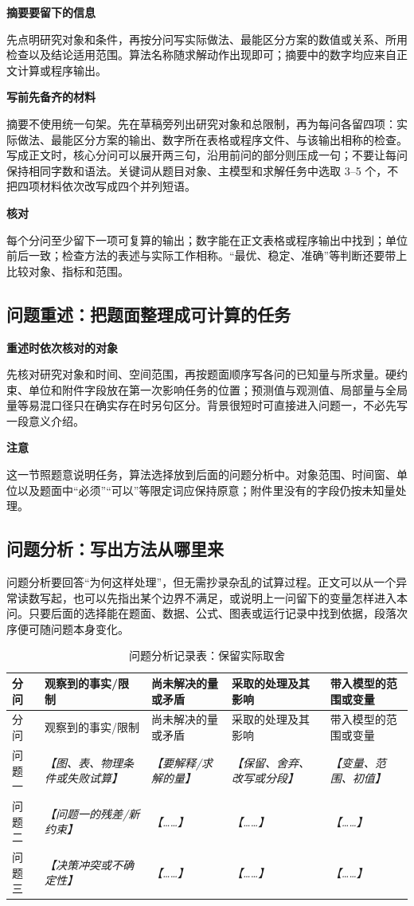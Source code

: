 \documentclass[UTF8,zihao=-4]{ctexart}
\newcommand{\slot}[1]{\textcolor{inkblue}{\textit{【#1】}}}
\newcommand{\guidehead}[1]{\par\medskip\noindent\textbf{\color{inkblue}#1}\par}
\begin{document}
\guidehead{摘要要留下的信息}先点明研究对象和条件，再按分问写实际做法、最能区分方案的数值或关系、所用检查以及结论适用范围。算法名称随求解动作出现即可；摘要中的数字均应来自正文计算或程序输出。

\guidehead{写前先备齐的材料}摘要不使用统一句架。先在草稿旁列出研究对象和总限制，再为每问各留四项：实际做法、最能区分方案的输出、数字所在表格或程序文件、与该输出相称的检查。写成正文时，核心分问可以展开两三句，沿用前问的部分则压成一句；不要让每问保持相同字数和语法。关键词从题目对象、主模型和求解任务中选取 3--5 个，不把四项材料依次改写成四个并列短语。

\guidehead{核对}每个分问至少留下一项可复算的输出；数字能在正文表格或程序输出中找到；单位前后一致；检查方法的表述与实际工作相称。“最优、稳定、准确”等判断还要带上比较对象、指标和范围。

\subsection{问题重述：把题面整理成可计算的任务}

\guidehead{重述时依次核对的对象}先核对研究对象和时间、空间范围，再按题面顺序写各问的已知量与所求量。硬约束、单位和附件字段放在第一次影响任务的位置；预测值与观测值、局部量与全局量等易混口径只在确实存在时另句区分。背景很短时可直接进入问题一，不必先写一段意义介绍。

\guidehead{注意}这一节照题意说明任务，算法选择放到后面的问题分析中。对象范围、时间窗、单位以及题面中“必须”“可以”等限定词应保持原意；附件里没有的字段仍按未知量处理。

\subsection{问题分析：写出方法从哪里来}

问题分析要回答“为何这样处理”，但无需抄录杂乱的试算过程。正文可以从一个异常读数写起，也可以先指出某个边界不满足，或说明上一问留下的变量怎样进入本问。只要后面的选择能在题面、数据、公式、图表或运行记录中找到依据，段落次序便可随问题本身变化。

\begin{longtable}{p{2.0cm}p{3.5cm}p{3.4cm}p{3.3cm}p{3.4cm}}
\caption{问题分析记录表：保留实际取舍}\label{tab:template-analysis-ledger}\\
\toprule
分问 & 观察到的事实/限制 & 尚未解决的量或矛盾 & 采取的处理及其影响 & 带入模型的范围或变量\\
\midrule
\endfirsthead
\toprule
分问 & 观察到的事实/限制 & 尚未解决的量或矛盾 & 采取的处理及其影响 & 带入模型的范围或变量\\
\midrule
\endhead
问题一 & \slot{图、表、物理条件或失败试算} & \slot{要解释/求解的量} & \slot{保留、舍弃、改写或分段} & \slot{变量、范围、初值}\\
问题二 & \slot{问题一的残差/新约束} & \slot{……} & \slot{……} & \slot{……}\\
问题三 & \slot{决策冲突或不确定性} & \slot{……} & \slot{……} & \slot{……}\\
\bottomrule
\end{longtable}
\end{document}

